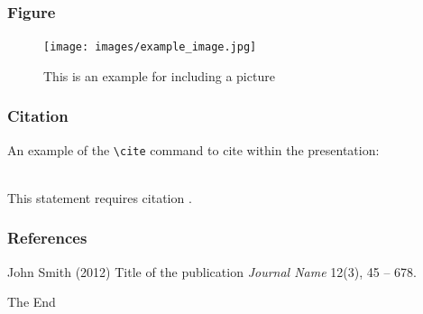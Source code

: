 \documentclass[14.5pt]{beamer}
\begin{document}

\begin{frame}
\frametitle{Figure}
\begin{figure}
\texttt{[image: images/example\_image.jpg]}
\caption{This is an example for including a picture}
\end{figure}
\end{frame}


\begin{frame}[fragile] %
\frametitle{Citation}
An example of the \verb|\cite| command to cite within the presentation:\\~

This statement requires citation \cite{p1}.
\end{frame}


\begin{frame}
\frametitle{References}
\footnotesize{
\begin{thebibliography}{99} %
 John Smith (2012)
\newblock Title of the publication
\newblock \emph{Journal Name} 12(3), 45 -- 678.
\end{thebibliography}
}
\end{frame}


\begin{frame}
\Huge{\centerline{The End}}
\end{frame}

\end{document}
